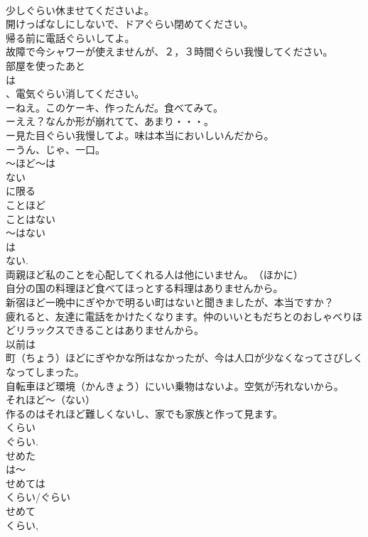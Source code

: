 \documentclass[8pt]{extreport}
\begin{document}
\begin{CJK}{UTF8}{min}
\\	少しぐらい休ませてくださいよ。
\\	開けっぱなしにしないで、ドアぐらい閉めてください。
\\	帰る前に電話ぐらいしてよ。
\\	故障で今シャワーが使えませんが、２，３時間ぐらい我慢してください。
\\	部屋を使ったあと
\\	は
\\	、電気ぐらい消してください。
\\	ーねえ。このケーキ、作ったんだ。食べてみて。
\\	ーええ？なんか形が崩れてて、あまり・・・。
\\	ー見た目ぐらい我慢してよ。味は本当においしいんだから。
\\	ーうん、じゃ、一口。
\\	～ほど～は
\\	ない
\\	に限る
\\	ことほど
\\	ことはない
\\	～はない 
\\	は 
\\	ない. 
\\	両親ほど私のことを心配してくれる人は他にいません。　（ほかに）
\\	自分の国の料理ほど食べてほっとする料理はありませんから。
\\	新宿ほど一晩中にぎやかで明るい町はないと聞きましたが、本当ですか？
\\	疲れると、友達に電話をかけたくなります。仲のいいともだちとのおしゃべりほどリラックスできることはありませんから。
\\	以前は
\\	町（ちょう）ほどにぎやかな所はなかったが、今は人口が少なくなってさびしくなってしまった。
\\	自転車ほど環境（かんきょう）にいい乗物はないよ。空気が汚れないから。
\\	それほど～（ない）
\\	作るのはそれほど難しくないし、家でも家族と作って見ます。
\\	くらい
\\	ぐらい.
\\	せめた
\\	は～
\\	せめては
\\	くらい/ぐらい 
\\	せめて 
\\	くらい, 

\end{CJK}
\end{document}
